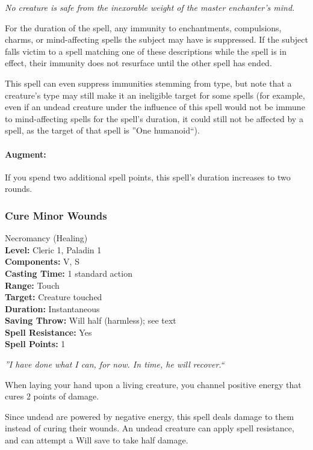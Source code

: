 \emph{No creature is safe from the inexorable weight of the master enchanter's mind.}

For the duration of the spell, any immunity to enchantments, compulsions, charms, or mind-affecting spells the subject may have is suppressed.
If the subject falls victim to a spell matching one of these descriptions while the spell is in effect, their immunity does not resurface until the
other spell has ended.

This spell can even suppress immunities stemming from type, but note that a creature's type may still make it an ineligible target for some spells
(for example, even if an undead creature under the influence of this spell would not be immune to mind-affecting spells for the spell's duration,
it could still not be affected by a  spell, as the target of that spell is ''One humanoid``).

\paragraph{Augment:} If you spend two additional spell points, this spell's duration increases to two rounds.
\subsubsection{Cure Minor Wounds}
\label{Spell:TouchOfVitality}
Necromancy (Healing)
\\ \textbf{Level:} Cleric 1, Paladin 1
\\ \textbf{Components:} V, S
\\ \textbf{Casting Time:} 1 standard action
\\ \textbf{Range:} Touch
\\ \textbf{Target:} Creature touched
\\ \textbf{Duration:} Instantaneous
\\ \textbf{Saving Throw:} Will half (harmless); see text
\\ \textbf{Spell Resistance:} Yes
\\ \textbf{Spell Points:} 1

\emph{''I have done what I can, for now. In time, he will recover.``}

When laying your hand upon a living creature, 
you channel positive energy that cures 2 points of damage.

Since undead are powered by negative energy, this spell deals damage to them instead of curing their wounds. 
An undead creature can apply spell resistance, and can attempt a Will save to take half damage.

